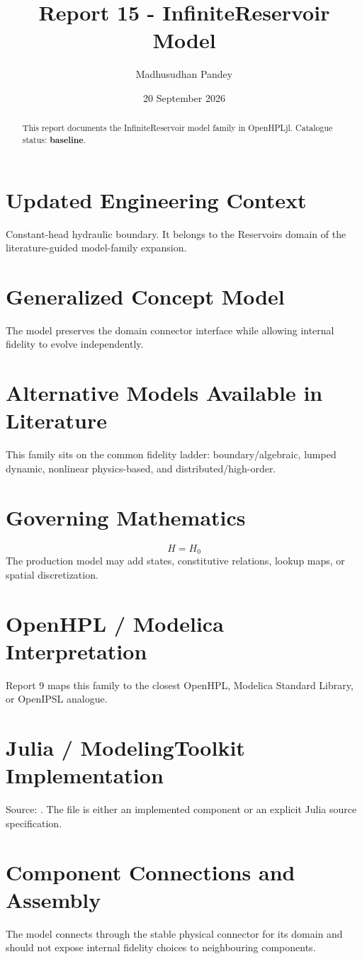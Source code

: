 \documentclass[10pt,a4paper]{article}
\title{Report 15 - InfiniteReservoir Model}
\author{Madhusudhan Pandey}
\date{20 September 2026}
\begin{document}
\maketitle
\begin{abstract}
This report documents the InfiniteReservoir model family in OpenHPLjl. Catalogue status: \textbf{baseline}.
\end{abstract}
\section{Updated Engineering Context}
Constant-head hydraulic boundary. It belongs to the Reservoirs domain of the literature-guided model-family expansion.
\section{Generalized Concept Model}
The model preserves the domain connector interface while allowing internal fidelity to evolve independently.
\section{Alternative Models Available in Literature}
This family sits on the common fidelity ladder: boundary/algebraic, lumped dynamic, nonlinear physics-based, and distributed/high-order.
\section{Governing Mathematics}
\[H=H_0\]
The production model may add states, constitutive relations, lookup maps, or spatial discretization.
\section{OpenHPL / Modelica Interpretation}
Report 9 maps this family to the closest OpenHPL, Modelica Standard Library, or OpenIPSL analogue.
\section{Julia / ModelingToolkit Implementation}
Source: \texttt{}. The file is either an implemented component or an explicit Julia source specification.
\section{Component Connections and Assembly}
The model connects through the stable physical connector for its domain and should not expose internal fidelity choices to neighbouring components.
\end{document}

